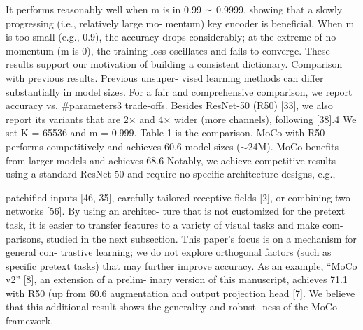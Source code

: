 \documentclass[10pt,twocolumn]{article}  %
\begin{document}
It performs reasonably well when m is in 0.99 ∼ 0.9999,
showing that a slowly progressing (i.e., relatively large mo-
mentum) key encoder is beneﬁcial. When m is too small
(e.g., 0.9), the accuracy drops considerably; at the extreme
of no momentum (m is 0), the training loss oscillates and
fails to converge. These results support our motivation of
building a consistent dictionary.
Comparison with previous results. Previous unsuper-
vised learning methods can differ substantially in model
sizes. For a fair and comprehensive comparison, we report
accuracy vs. #parameters3 trade-offs. Besides ResNet-50
(R50) [33], we also report its variants that are 2× and 4×
wider (more channels), following [38].4 We set K = 65536
and m = 0.999. Table 1 is the comparison.
MoCo with R50 performs competitively and achieves
60.6%
model sizes ($\sim $24M). MoCo beneﬁts from larger models and
achieves 68.6%
Notably, we achieve competitive results using a standard
ResNet-50 and require no speciﬁc architecture designs, e.g.,


patchiﬁed inputs [46, 35], carefully tailored receptive ﬁelds
[2], or combining two networks [56]. By using an architec-
ture that is not customized for the pretext task, it is easier to
transfer features to a variety of visual tasks and make com-
parisons, studied in the next subsection.
This paper's focus is on a mechanism for general con-
trastive learning; we do not explore orthogonal factors (such
as speciﬁc pretext tasks) that may further improve accuracy.
As an example, “MoCo v2” [8], an extension of a prelim-
inary version of this manuscript, achieves 71.1%
with R50 (up from 60.6%
augmentation and output projection head [7]. We believe
that this additional result shows the generality and robust-
ness of the MoCo framework.

\end{document}
